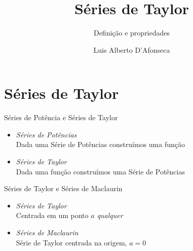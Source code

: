 
\usepackage{apresentacao}
\usepackage{tabto}

\graphicspath{{./figs/}}

\newcommand{\mytitle}   {Séries de Taylor}
\newcommand{\mysubtitle}{Definição e propriedades}
\title   {\mytitle}
\subtitle{\mysubtitle}
\author  {\large Luis Alberto D'Afonseca}
\date    {}



\begin{frame}
    \titlepage
\end{frame}

\section{Séries de Taylor}

\begin{frame}{Séries de Potência e Séries de Taylor}
  \begin{itemize}[<+->]
    \item \emph{Séries de Potências} \\[3mm]
          Dada uma Série de Potências construímos uma função \\[11mm]
    \item \emph{Séries de Taylor}   \\[3mm]
          Dada uma função construímos uma Série de Potências
  \end{itemize}
\end{frame}

\begin{frame}{Séries de Taylor e Séries de Maclaurin}
  \begin{itemize}[<+->]
    \item \emph{Séries de Taylor}   \\[3mm]
    Centrada em um ponto \emph{$a$ qualquer} \\[11mm]
    \item \emph{Séries de Maclaurin}   \\[3mm]
    Série de Taylor centrada na origem, \emph{$a=0$}
  \end{itemize}
\end{frame}

